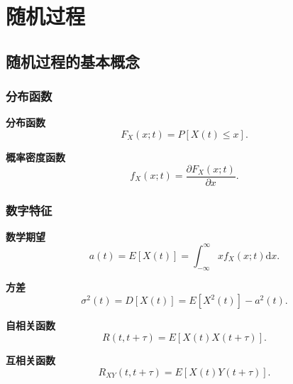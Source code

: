 \section{随机过程}
\subsection{随机过程的基本概念}
\subsubsection{分布函数}
\textbf{分布函数}
\begin{equation}
    F_X(x;t)=P[X(t)\leq x].
\end{equation}

\textbf{概率密度函数}
\begin{equation}
    f_X(x;t)=\frac{\partial F_X(x;t)}{\partial x}.
\end{equation}

\subsubsection{数字特征}
\textbf{数学期望}
\begin{equation}
    a(t)=E[X(t)]=\int_{-\infty}^{\infty}xf_X(x;t)\mathrm{d}x.
\end{equation}

\textbf{方差}
\begin{equation}
    \sigma^2(t)=D[X(t)]=E[X^2(t)]-a^2(t).
\end{equation}

\textbf{自相关函数}
\begin{equation}
    R(t,t+\tau)=E[X(t)X(t+\tau)].
\end{equation}

\textbf{互相关函数}
\begin{equation}
    R_{XY}(t,t+\tau)=E[X(t)Y(t+\tau)].
\end{equation}
